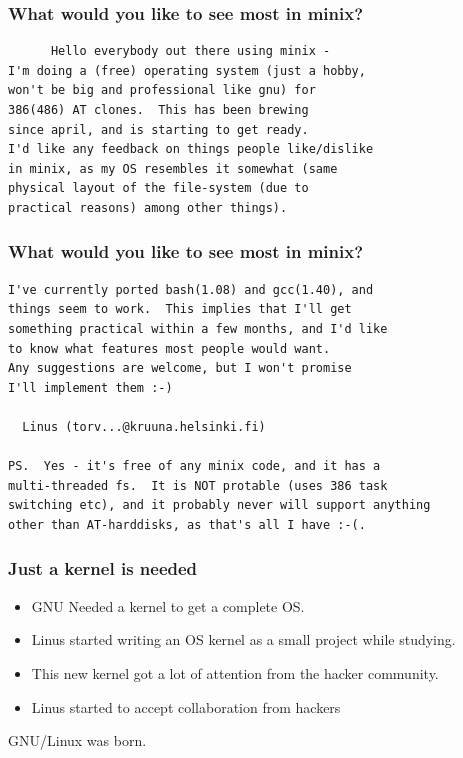 \documentclass[hyperref={pdfpagelabels=false},xcolor=pst,pdf,fragile]{beamer}
\begin{document}
\begin{frame}[fragile]
  \frametitle{What would you like to see most in minix?}

  \begin{lstlisting}
	  Hello everybody out there using minix -
I'm doing a (free) operating system (just a hobby,
won't be big and professional like gnu) for
386(486) AT clones.  This has been brewing
since april, and is starting to get ready.
I'd like any feedback on things people like/dislike
in minix, as my OS resembles it somewhat (same
physical layout of the file-system (due to
practical reasons) among other things).

  \end{lstlisting}

\end{frame}

\begin{frame}[fragile]
  \frametitle{What would you like to see most in minix?}

  \begin{lstlisting}
I've currently ported bash(1.08) and gcc(1.40), and
things seem to work.  This implies that I'll get
something practical within a few months, and I'd like
to know what features most people would want.
Any suggestions are welcome, but I won't promise
I'll implement them :-)

  Linus (torv...@kruuna.helsinki.fi)

PS.  Yes - it's free of any minix code, and it has a
multi-threaded fs.  It is NOT protable (uses 386 task
switching etc), and it probably never will support anything
other than AT-harddisks, as that's all I have :-(. 
  \end{lstlisting}

\end{frame}

\begin{frame}
  \frametitle{Just a kernel is needed}

  \begin{itemize}
	  \item GNU Needed a kernel to get a complete OS.
	  \item Linus started writing an OS kernel as a small project while
		  studying.
  \end{itemize}

  \hskip-20pt

  \begin{itemize}
	  \item This new kernel got a lot of attention from the hacker
		  community. 
		  \pause
	  \item \alert{Linus started to accept collaboration from hackers}
  \end{itemize}

  \pause
  \begin{center}
	  GNU/Linux was born.
  \end{center}

\end{frame}
\end{document}
